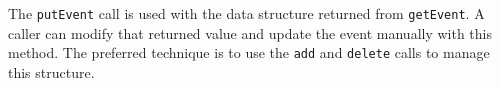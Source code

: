 The \verb+putEvent+ call is used with the data structure returned from \verb+getEvent+. A caller can modify
that returned value and update the event manually with this method. The preferred technique is to use the \verb+add+ and
\verb+delete+ calls to manage this structure.
